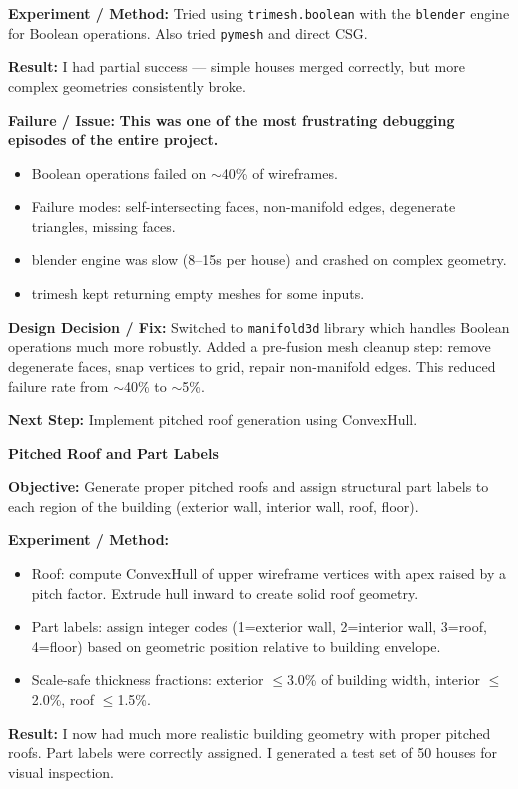 \documentclass[11pt, letterpaper]{article}
\newcounter{entrynum}
\newcommand{\entry}[2]{%
  \refstepcounter{entrynum}%
  \vspace{6mm}%
  \noindent\begin{tcolorbox}[
    colback=bglight, colframe=entryblue,
    boxrule=1pt, arc=3pt,
    title={\textbf{Entry \theentrynum}\hfill\textbf{#1}},
    fonttitle=\large\color{white},
    colbacktitle=entryblue,
    left=3mm, right=3mm, top=2mm, bottom=2mm
  ]
  {\large\bfseries\color{entryblue} #2}
  \end{tcolorbox}
  \vspace{-1mm}%
}
\newcommand{\objective}{\par\textbf{\color{entryblue}Objective:} }
\newcommand{\experiment}{\par\textbf{\color{entryblue}Experiment / Method:} }
\newcommand{\result}{\par\textbf{\color{entryblue}Result:} }
\newcommand{\failure}{\par\textbf{\color{failred}Failure / Issue:} }
\newcommand{\fix}{\par\textbf{\color{fixgreen}Design Decision / Fix:} }
\newcommand{\nextstep}{\par\textbf{\color{notegray}Next Step:} }
\begin{document}
\experiment
Tried using \texttt{trimesh.boolean} with the \texttt{blender} engine for
Boolean operations. Also tried \texttt{pymesh} and direct CSG.

\result
I had partial success --- simple houses merged correctly, but more complex geometries consistently broke.

\failure
\textbf{This was one of the most frustrating debugging episodes of the
entire project.}
\begin{itemize}[nosep]
  \item Boolean operations failed on $\sim$40\% of wireframes.
  \item Failure modes: self-intersecting faces, non-manifold edges,
    degenerate triangles, missing faces.
  \item blender engine was slow (8--15s per house) and crashed on complex
    geometry.
  \item trimesh kept returning empty meshes for some inputs.
\end{itemize}

\fix
Switched to \texttt{manifold3d} library which handles Boolean operations
much more robustly. Added a pre-fusion mesh cleanup step: remove degenerate
faces, snap vertices to grid, repair non-manifold edges. This reduced failure
rate from $\sim$40\% to $\sim$5\%.

\nextstep
Implement pitched roof generation using ConvexHull.

\entry{January 22, 2026}{Pitched Roof and Part Labels}

\objective
Generate proper pitched roofs and assign structural part labels to each region
of the building (exterior wall, interior wall, roof, floor).

\experiment
\begin{itemize}[nosep]
  \item Roof: compute ConvexHull of upper wireframe vertices with apex raised
    by a pitch factor. Extrude hull inward to create solid roof geometry.
  \item Part labels: assign integer codes (1=exterior wall, 2=interior wall,
    3=roof, 4=floor) based on geometric position relative to building envelope.
  \item Scale-safe thickness fractions: exterior $\leq$3.0\% of building width,
    interior $\leq$2.0\%, roof $\leq$1.5\%.
\end{itemize}

\result
I now had much more realistic building geometry with proper pitched roofs. Part labels were correctly assigned. I generated a test set of 50 houses for visual inspection.
\end{document}
